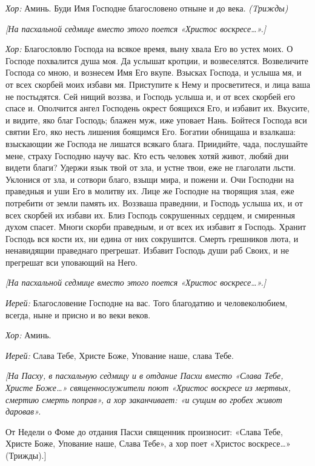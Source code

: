 \begin{mymulticols}
{\itshape Хор:} Аминь. Буди Имя Господне благословено отныне и до века. {\itshape (Tрижды)}

{\itshape [На пасхальной седмице вместо этого поется «Христос воскресе…».]}


{\itshape Хор:} Благословлю Господа на всякое время, выну хвала Его во устех моих. О Господе похвалится душа моя. Да услышат кротции, и возвеселятся. Возвеличите Господа со мною, и вознесем Имя Его вкупе. Взысках Господа, и услыша мя, и от всех скорбей моих избави мя. Приступите к Нему и просветитеся, и лица ваша не постыдятся. Сей нищий воззва, и Господь услыша и, и от всех скорбей его спасе и. Ополчится ангел Господень окрест боящихся Его, и избавит их. Вкусите, и видите, яко благ Господь; блажен муж, иже уповает Нань. Бойтеся Господа вси святии Его, яко несть лишения боящимся Его. Богатии обнищаша и взалкаша: взыскающии же Господа не лишатся всякаго блага. Приидийте, чада, послушайте мене, страху Господню научу вас. Кто есть человек хотяй живот, любяй дни видети благи? Удержи язык твой от зла, и устне твои, еже не глаголати льсти. Уклонися от зла, и сотвори благо, взыщи мира, и пожени и. Очи Господни на праведныя и уши Его в молитву их. Лице же Господне на творящия злая, еже потребити от земли память их. Воззваша праведнии, и Господь услыша их, и от всех скорбей их избави их. Близ Господь сокрушенных сердцем, и смиренныя духом спасет. Многи скорби праведным, и от всех их избавит я Господь. Хранит Господь вся кости их, ни едина от них сокрушится. Смерть грешников люта, и ненавидящии праведнаго прегрешат. Избавит Господь души раб Своих, и не прегрешат вси уповающий на Него.

{\itshape [На пасхальной седмице вместо этого поется «Христос воскресе…».]}

{\itshape Иерей:} Благословение Господне на вас. Того благодатию и человеколюбием, всегда, ныне и присно и во веки веков.

{\itshape Хор:} Аминь.

{\itshape Иерей:} Слава Тебе, Христе Боже, Упование наше, слава Тебе.

{\itshape[На Пасху, в пасхальную седмицу и в отдание Пасхи вместо «Слава Тебе, Христе Боже…» священнослужители поют «Христос воскресе из мертвых, смертию смерть поправ», а хор заканчивает: «и сущим во гробех живот даровав». 

От Недели о Фоме до отдания Пасхи священник произносит: «Слава Тебе, Христе Боже, Упование наше, Слава Тебе», а хор поет «Христос воскресе…» (Трижды).]}


\end{mymulticols}
